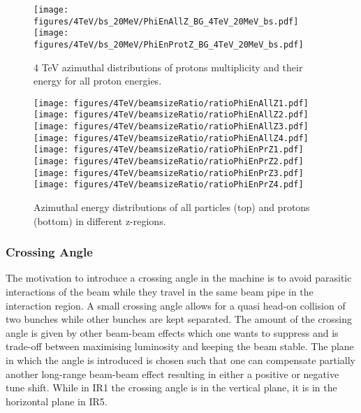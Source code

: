 \begin{figure}[!htb]
\begin{center}
  \texttt{[image: figures/4TeV/bs\_20MeV/PhiEnAllZ\_BG\_4TeV\_20MeV\_bs.pdf]}
  \texttt{[image: figures/4TeV/bs\_20MeV/PhiEnProtZ\_BG\_4TeV\_20MeV\_bs.pdf]}
\end{center}
\vspace{-0.6cm}
 \caption{4 TeV azimuthal distributions of protons multiplicity and their energy for all proton energies.
  \label{bsZ}}
\end{figure}

\begin{figure}[!htb]
\begin{center}
  \texttt{[image: figures/4TeV/beamsizeRatio/ratioPhiEnAllZ1.pdf]}
  \texttt{[image: figures/4TeV/beamsizeRatio/ratioPhiEnAllZ2.pdf]}
  \texttt{[image: figures/4TeV/beamsizeRatio/ratioPhiEnAllZ3.pdf]}
  \texttt{[image: figures/4TeV/beamsizeRatio/ratioPhiEnAllZ4.pdf]}
  \texttt{[image: figures/4TeV/beamsizeRatio/ratioPhiEnPrZ1.pdf]}
  \texttt{[image: figures/4TeV/beamsizeRatio/ratioPhiEnPrZ2.pdf]}
  \texttt{[image: figures/4TeV/beamsizeRatio/ratioPhiEnPrZ3.pdf]}
  \texttt{[image: figures/4TeV/beamsizeRatio/ratioPhiEnPrZ4.pdf]}
\end{center}
\vspace{-0.6cm}
 \caption{Azimuthal energy distributions of all particles (top) and protons (bottom) in different z-regions.
  \label{bsZ}}
\end{figure}

\subsubsection{Crossing Angle}
The motivation to introduce a crossing angle in the machine is to avoid parasitic interactions of the beam while they travel in the same beam pipe in the interaction region. A small crossing angle allows for a quasi head-on collision of two bunches while other bunches are kept separated. The amount of the crossing angle is given by other beam-beam effects which one wants to suppress and is trade-off between maximising luminosity and keeping the beam stable. The plane in which the angle is introduced is chosen such that one can compensate partially another long-range beam-beam effect resulting in either a positive or negative tune shift. While in IR1 the crossing angle is in the vertical plane, it is in the horizontal plane in IR5.


